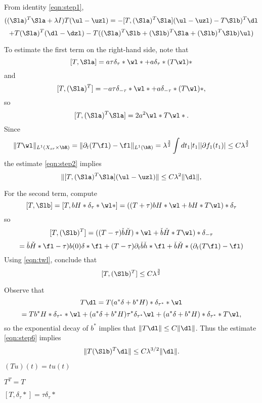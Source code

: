 From identity \ref{eqn:step1},
\[
   ((\Sla)^T\Sla + \lambda I) T(\ul-\uzl) = -[T,
   (\Sla)^T\Sla](\ul-\uzl) - T \Slb)^T \dl 
 \]
\begin{equation}
  \label{eqn:step3}
 + T (\Sla)^T(\dl-\dzl)- 
  T((\Sla)^T\Slb + (\Slb)^T\Sla + (\Slb)^T\Slb)\ul)
\end{equation}

To estimate the first term on the right-hand side, note that
\[
  [T,\Sla] = a \tau \delta_{\tau} * \wl* + a \delta_{\tau} * (T\wl)*
\]
and
\[
  [T,(\Sla)^T] = -a \tau \delta_{-\tau} * \wl* + a 
  \delta_{-\tau}*(T\wl)*,
\]
so
\[
  [T,  (\Sla)^T\Sla] = 2 a^2 \wl*T\wl*.
\]
Since
\begin{equation}
  \label{eqn:twl}
  \|T\wl\|_{L^1(X_{sr}\times \bR)} =
  \|\partial_t(T\fl)-\fl\|_{L^1(\bR)} =\lambda^{\frac{3}{2}}\int dt_1
  |t_1||\partial f_1(t_1)| \le C \lambda^{\frac{3}{2}}
\end{equation}
the estimate \ref{eqn:step2} implies
\begin{equation}
  \label{step5}
  \|[T,  (\Sla)^T\Sla](\ul-\uzl)\| \le C \lambda^{2}\|\dl\|,
\end{equation}

For the second term, compute
\[
  [T, \Slb] = [T,bH*\delta_{\tau}*\wl*] = ((T+\tau)bH*\wl
  + bH*T\wl)*\delta_{\tau}
\]
so
\[
  [T,(\Slb)^T]  =  ((T - \tau) \check{b}\check{H})*\wl
  + \check{b}\check{H}*T\wl)*\delta_{-\tau}
\]
\[
= \check{b}\check{H}*\fl
-\tau)b(0)\delta *\fl + (T-\tau)
\partial_t\check{b}\check{h}*\fl +
\check{b}\check{H}*(\partial_t(T\fl)-\fl)
\]
Using \ref{eqn:twl}, conclude that
\begin{equation}
  \label{eqn:step6}
  [T, (\Slb)^T] \le C \lambda^{\frac{3}{2}}
\end{equation}

Observe that
\[
  T\dl=T(a^*\delta + b^*H)*\delta_{\tau^*}*\wl
\]
\[
  =Tb^*H *\delta_{\tau^*}*\wl+(a^*\delta+b^*H)\tau^*\delta_{\tau^*}\wl
  +(a^*\delta + b^*H)*\delta_{\tau^*}*T\wl,
\]
so the exponential decay of $b^*$ implies that $\|T\dl\| \le
C\|\dl\|$. Thus the estimate \ref{eqn:step6} implies
\begin{equation}
  \label{eqn:step7}
  \|T(\Slb)^T\dl\| \le C \lambda^{3/2}\|\dl\|.
\end{equation}
                
  


$(Tu)(t) = tu(t)$

$T^T = T$

$[T,\delta_{\tau}*] = \tau \delta_{\tau}*$

